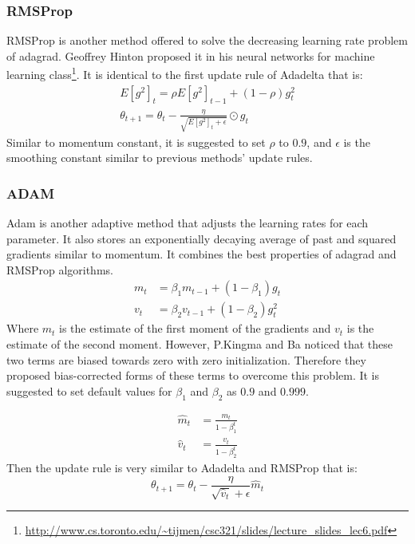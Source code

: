 \documentclass[a4paper, nobind]{templates/ociamthesis}
\begin{document}
\hypertarget{rmsprop}{%
\subsubsection{RMSProp}\label{rmsprop}}

\noindent RMSProp is another method offered to solve the decreasing learning rate problem of adagrad. Geoffrey Hinton proposed it in his neural networks for machine learning class\footnote{\url{http://www.cs.toronto.edu/~tijmen/csc321/slides/lecture_slides_lec6.pdf}}. It is identical to the first update rule of Adadelta that is:
\[
\begin{aligned}
E\left[g^{2}\right]_{t}=\rho E\left[g^{2}\right]_{t-1}+(1-\rho) g_{t}^{2} \\
\theta_{t+1}=\theta_{t}-\frac{\eta}{\sqrt{E\left[g^{2}\right]_{t}+\epsilon}} \odot g_{t}
\end{aligned}
\]
Similar to momentum constant, it is suggested to set \(\rho\) to \(0.9\), and \(\epsilon\) is the smoothing constant similar to previous methods' update rules.

\hypertarget{adam}{%
\subsubsection{ADAM}\label{adam}}

\noindent Adam is another adaptive method that adjusts the learning rates for each parameter. It also stores an exponentially decaying average of past and squared gradients similar to momentum. It combines the best properties of adagrad and RMSProp algorithms.
\[
\begin{aligned}
m_{t} &=\beta_{1} m_{t-1}+\left(1-\beta_{1}\right) g_{t} \\
v_{t} &=\beta_{2} v_{t-1}+\left(1-\beta_{2}\right) g_{t}^{2}
\end{aligned}
\]
Where \(m_t\) is the estimate of the first moment of the gradients and \(v_t\) is the estimate of the second moment. However, P.Kingma and Ba \cite{kingma2017adam} noticed that these two terms are biased towards zero with zero initialization. Therefore they proposed bias-corrected forms of these terms to overcome this problem. It is suggested to set default values for \(\beta_1\) and \(\beta_2\) as \(0.9\) and \(0.999\).

\[
\begin{aligned}
\hat{m}_{t} &=\frac{m_{t}}{1-\beta_{1}^{t}} \\
\hat{v}_{t} &=\frac{v_{t}}{1-\beta_{2}^{t}}
\end{aligned}
\]
Then the update rule is very similar to Adadelta and RMSProp that is:
\[
\theta_{t+1}=\theta_{t}-\frac{\eta}{\sqrt{\hat{v}_{t}}+\epsilon} \hat{m}_{t}
\]
\end{document}
